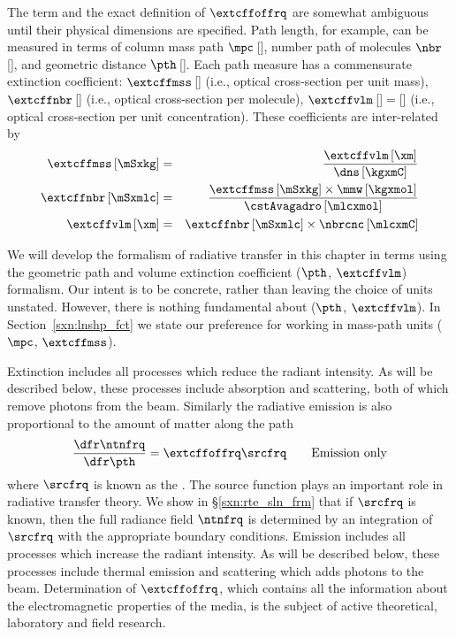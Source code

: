 \documentclass[12pt]{article}
\begin{document}
The term  and the exact definition of
$\extcffoffrq$ are somewhat ambiguous until their physical dimensions
are specified.   
Path length, for example, can be measured in terms of 
column mass path $\mpc$\,[\kgxmS],  
number path of molecules $\nbr$\,[\nbrxmS],
and geometric distance $\pth$\,[\m]. 
Each path measure has a commensurate extinction coefficient: 
 $\extcffmss$\,[\mSxkg] 
(i.e., optical cross-section per unit mass), 
 $\extcffnbr$\,[\mSxmlc] 
(i.e., optical cross-section per molecule), 
 $\extcffvlm$\,[\mSxmC]$=$[\xm]
(i.e., optical cross-section per unit concentration).
These coefficients are inter-related by 
\begin{eqnarray}
\extcffmss\,\mbox{[\mSxkg]} & = & \frac{\extcffvlm\,\mbox{[\xm]}}{\dns\,\mbox{[\kgxmC]}} \nonumber \\
\extcffnbr\,\mbox{[\mSxmlc]} & = & \frac{\extcffmss\,\mbox{[\mSxkg]} \times \mmw\,\mbox{[\kgxmol]}}{\cstAvagadro\,\mbox{[\mlcxmol]}} \nonumber \\
\extcffvlm\,\mbox{[\xm]} & = & \extcffnbr\,\mbox{[\mSxmlc]} \times \nbrcnc\,\mbox{[\mlcxmC]}
\label{eqn:np}
\end{eqnarray}

We will develop the formalism of radiative transfer in this chapter 
in terms using the geometric path and volume extinction coefficient 
($\pth$, $\extcffvlm$) formalism. 
Our intent is to be concrete, rather than leaving the choice of units
unstated. 
However, there is nothing fundamental about ($\pth$, $\extcffvlm$).
In Section~\ref{sxn:lnshp_fct} we state our preference for working in 
mass-path units ($\mpc$, $\extcffmss$).

Extinction includes all processes which reduce the radiant intensity.
As will be described below, these processes include absorption and
scattering, both of which remove photons from the beam.
Similarly the radiative emission is also proportional to the amount
of matter along the path
\begin{equation}
\frac{\dfr\ntnfrq}{\dfr\pth} = \extcffoffrq \srcfrq \qquad\mathrm{Emission\ only}
\label{eqn:msn_dfn}
\end{equation}
where $\srcfrq$ is known as the .
The source function plays an important role in radiative transfer
theory.
We show in \S\ref{sxn:rte_sln_frm} that if $\srcfrq$ is known, then
the full radiance field $\ntnfrq$ is determined by an integration of
$\srcfrq$ with the appropriate boundary conditions. 
Emission includes all processes which increase the radiant intensity.
As will be described below, these processes include thermal emission and
scattering which adds photons to the beam.
Determination of $\extcffoffrq$, which contains all the
information about the electromagnetic properties of the media, is the
subject of active theoretical, laboratory and field research. 
\end{document}
